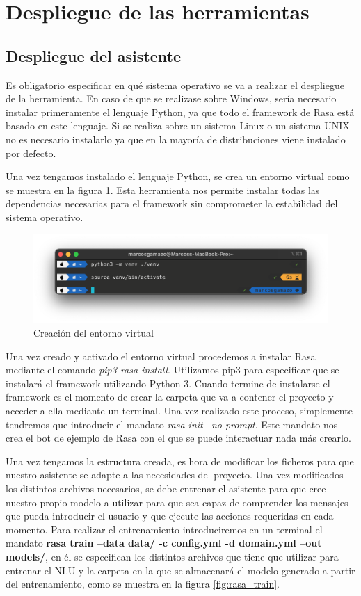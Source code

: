 \section{Despliegue de las herramientas}

\subsection{Despliegue del asistente}
Es obligatorio especificar en qué sistema operativo se va a realizar el despliegue de la herramienta. En caso de que se realizase sobre Windows, sería necesario instalar primeramente el lenguaje Python, ya que todo el framework de Rasa está basado en este lenguaje. Si se realiza sobre un sistema Linux o un sistema UNIX no es necesario instalarlo ya que en la mayoría de distribuciones viene instalado por defecto.

Una vez tengamos instalado el lenguaje Python, se crea un entorno virtual como se muestra en la figura \ref{fig:venv}. Esta herramienta nos permite instalar todas las dependencias necesarias para el framework sin comprometer la estabilidad del sistema operativo. 

\begin{figure}[H]
    \centering
    \includegraphics[scale=0.5]{include/capturas/VirtualEnv.png}
    \caption{Creación del entorno virtual}
    \label{fig:venv}
\end{figure}

Una vez creado y activado el entorno virtual procedemos a instalar Rasa mediante el comando \textit{pip3 rasa install}. Utilizamos pip3 para especificar que se instalará el framework utilizando Python 3. Cuando termine de instalarse el framework es el momento de crear la carpeta que va a contener el proyecto y acceder a ella mediante un terminal. Una vez realizado este proceso, simplemente tendremos que introducir el mandato \textit{rasa init --no-prompt}. Este mandato nos crea el bot de ejemplo de Rasa con el que se puede interactuar nada más crearlo.

Una vez tengamos la estructura creada, es hora de modificar los ficheros para que nuestro asistente se adapte a las necesidades del proyecto. Una vez modificados los distintos archivos necesarios, se debe entrenar el asistente para que cree nuestro propio modelo a utilizar para que sea capaz de comprender los mensajes que pueda introducir el usuario y que ejecute las acciones requeridas en cada momento. Para realizar el entrenamiento introduciremos en un terminal el mandato \textbf{rasa train --data data/ -c config.yml -d domain.yml --out models/}, en él se especifican los distintos archivos que tiene que utilizar para entrenar el NLU y la carpeta en la que se almacenará el modelo generado a partir del entrenamiento, como se muestra en la figura \ref{fig:rasa_train}.

